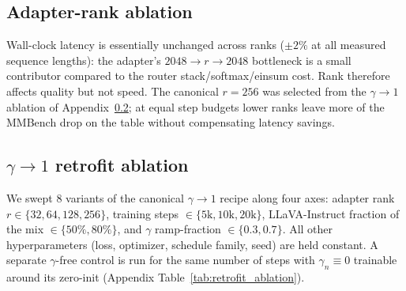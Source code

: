 \documentclass{article}
\begin{document}
\subsection{Adapter-rank ablation}
\label{app:rank_ablation}
Wall-clock latency is essentially unchanged across ranks ($\pm 2\%$ at all measured sequence lengths): the adapter's $2048{\to}r{\to}2048$ bottleneck is a small contributor compared to the router stack/softmax/einsum cost. Rank therefore affects quality but not speed. The canonical $r{=}256$ was selected from the $\gamma{\to}1$ ablation of Appendix~\ref{app:retrofit_ablation}; at equal step budgets lower ranks leave more of the MMBench drop on the table without compensating latency savings.

\subsection{\texorpdfstring{$\gamma{\to}1$ retrofit ablation}{gamma-to-1 retrofit ablation}}
\label{app:retrofit_ablation}
We swept $8$ variants of the canonical $\gamma{\to}1$ recipe along four axes: adapter rank $r\in\{32,64,128,256\}$, training steps $\in\{5\text{k},10\text{k},20\text{k}\}$, LLaVA-Instruct fraction of the mix $\in\{50\%,80\%\}$, and $\gamma$ ramp-fraction $\in\{0.3,0.7\}$. All other hyperparameters (loss, optimizer, schedule family, seed) are held constant. A separate $\gamma$-free control is run for the same number of steps with $\gamma_n\equiv 0$ trainable around its zero-init (Appendix Table~\ref{tab:retrofit_ablation}).
\end{document}
